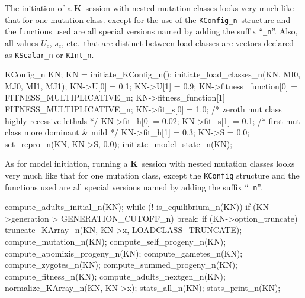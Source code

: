 \documentclass[10pt,twoside,a4paper,fleqn]{report}
\numberwithin{equation}{section}  %
\newcommand{\K}{{\bf K}}
\newcommand{\KConfign}{\mbox{\tt KConfig\_n}}
\begin{document}
{The initiation of a \K\ session with nested mutation classes looks very much like that for one mutation class.   except for the use of the \KConfign\ structure and the functions used are all special versions named by adding the suffix ``\lstinline{_n}''.  Also, all values $U_c$, $s_c$, etc.\ that are distinct between load classes are vectors declared as \lstinline{KScalar_n} or \lstinline{KInt_n}.
\begin{C}[gobble=4]
    KConfig_n KN;
    KN = initiate_KConfig_n();
    initiate_load_classes_n(KN, MI0, MJ0, MI1, MJ1);
    KN->U[0] = 0.1;
    KN->U[1] = 0.9;
    KN->fitness_function[0] = FITNESS_MULTIPLICATIVE_n;
    KN->fitness_function[1] = FITNESS_MULTIPLICATIVE_n;
    KN->fit_s[0] = 1.0;  /* zeroth mut class highly recessive lethals */
    KN->fit_h[0] = 0.02;
    KN->fit_s[1] = 0.1;  /* first mut class more dominant & mild */
    KN->fit_h[1] = 0.3;
    KN->S = 0.0;
    set_repro_n(KN, KN->S, 0.0);
    initiate_model_state_n(KN);
\end{C}
As for model initiation, running a \K\ session with nested mutation classes looks very much like that for one mutation class, except the \lstinline{KConfig} structure and the functions used are all special versions named by adding the suffix ``\lstinline{_n}''.
\begin{C}[gobble=4]
    compute_adults_initial_n(KN);
    while (! is_equilibrium_n(KN)) {
        if (KN->generation > GENERATION_CUTOFF_n)
            break;
        if (KN->option_truncate)
            truncate_KArray_n(KN, KN->x, LOADCLASS_TRUNCATE);
        compute_mutation_n(KN);
        compute_self_progeny_n(KN);
        compute_apomixis_progeny_n(KN);
        compute_gametes_n(KN);
        compute_zygotes_n(KN);
        compute_summed_progeny_n(KN);
        compute_fitness_n(KN);
        compute_adults_nextgen_n(KN);
        normalize_KArray_n(KN, KN->x);
    }
    stats_all_n(KN);
    stats_print_n(KN);
\end{C}



}
\end{document}
